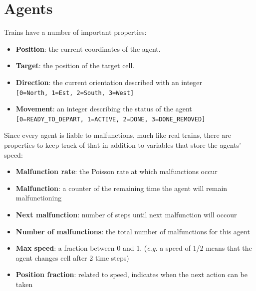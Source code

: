 \section{Agents}
Trains have a number of important properties:
\begin{itemize}
\item \textbf{Position}: the current coordinates of the agent.
\item \textbf{Target}: the position of the target cell.
\item \textbf{Direction}: the current orientation described with an integer\\
    \verb|[0=North, 1=Est, 2=South, 3=West]|
\item \textbf{Movement}: an integer describing the status of the agent\\
    \verb|[0=READY_TO_DEPART, 1=ACTIVE, 2=DONE, 3=DONE_REMOVED]|
\end{itemize}
\noindent
Since every agent is liable to malfunctions, much like real trains, there are properties to keep track of that in addition to variables that store the agents' speed:
\begin{itemize}
\item \textbf{Malfunction rate}: the Poisson rate at which malfunctions occur
\item \textbf{Malfunction}: a counter of the remaining time the agent will remain malfunctioning
\item \textbf{Next malfunction}: number of steps until next malfunction will occour
\item \textbf{Number of malfunctions}: the total number of malfunctions for this agent
\item \textbf{Max speed}: a fraction between 0 and 1. (\textit{e.g.} a speed of 1/2 means that the agent changes cell after 2 time steps)
\item \textbf{Position fraction}: related to speed, indicates when the next action can be taken
\end{itemize}
